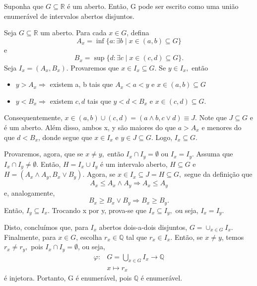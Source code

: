 \documentclass[measure_theory.tex]{subfiles}
\begin{document}
\begin{prop*}
	Suponha que \(G\subseteq \mathbb{R}\) é um aberto. Então, G pode ser escrito como uma união enumerável de intervalos abertos disjuntos.
\end{prop*}
\begin{proof*}
	Seja \(G\subseteq \mathbb{R}\) um aberto. Para cada \(x\in G\), defina
	\[
		A_{x} = \inf_{}\{a: \exists b\mid x\in (a, b)\subseteq G\}
	\]
	e
	\[
		B_{x} = \sup_{}\{d: \exists c\mid x\in (c, d)\subseteq G\}.
	\]
	Seja \(I_{x} = (A_{x}, B_{x}).\) Provaremos que \(x\in I_{x}\subseteq G\). Se \(y\in I_{x},\) então
	\begin{itemize}
		\item \(y > A_{x} \Rightarrow \) existem a, b tais que \(A_{x} < a < y\) e \(x\in (a, b)\subseteq G\)
		\item \(y < B_{x} \Rightarrow \) existem \(c, d\) tais que \(y < d < B_{x}\) e \(x\in (c, d)\subseteq G\).
	\end{itemize}
	Consequentemente, \(x\in (a, b)\cup (c, d) = (a\wedge b, c\vee d)\equiv J.\) Note que \(J\subseteq G\) e é um aberto. Além disso, ambos x, y são maiores
	do que \(a > A_{x}\) e menores do que \(d < B_{x}\), donde segue que \(x\in I_{x}\) e \(y\in J\subseteq G\). Logo, \(I_{x}\subseteq G.\)

	Provaremos, agora, que se \(x\neq y,\) então \(I_{x}\cap I_{y} = \emptyset \) ou \(I_{x} = I_{y}.\) Assuma que \(I_{x}\cap I_{y}\neq\emptyset.\) Então,
	\(H = I_{x}\cup I_{y}\) é um intervalo aberto, \(H \subseteq G\) e \(H = (A_{x}\wedge A_{y}, B_{x}\vee B_{y}).\) Agora, se \(x\in I_{x}\subseteq J = H \subseteq G,\) segue da definição que
	\[
		A_{x} \leq A_{x}\wedge A_{y} \Rightarrow A_{x} \leq A_{y}
	\]
	e, analogamente,
	\[
		B_{x} \geq B_{x}\vee B_{y}\Rightarrow B_{x}\geq B_{y}.
	\]
	Então, \(I_{y}\subseteq I_x\). Trocando x por y, prova-se que \(I_x \subseteq I_y,\) ou seja, \(I_{x} = I_{y}\).

	Disto, concluímos que, para \(I_{x}\) abertos dois-a-dois disjuntos, \(G = \cup_{x\in G}I_{x}.\) Finalmente, para \(x\in G\), escolha \(r_{x}\in \mathbb{Q}\) tal que \(r_{x}\in I_x\). Então,
	se \(x\neq y\), temos \(r_{x}\neq r_y,\) pois \(I_{x}\cap I_{y} = \emptyset \), ou seja,
	\begin{align*}
		\varphi : & G = \bigcup_{x\in G}^{}I_{x}\rightarrow \mathbb{Q} \\
		          & x \mapsto r_{x}
	\end{align*}
	é injetora. Portanto, G é enumerável, pois \(\mathbb{Q}\) é enumerável. \qedsymbol
\end{proof*}
\end{document}
